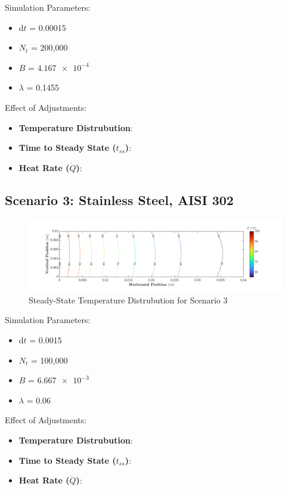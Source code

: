 \documentclass{article}
\begin{document}
Simulation Parameters:
\begin{itemize}
    \item d$t$ = 0.00015
    \item $N_t$ = 200,000
    \item $B$ = $\SI{4.167e-4}{}$
    \item $\lambda$ = 0.1455
\end{itemize}

Effect of Adjustments:
\begin{itemize}
    \item \textbf{Temperature Distrubution}:
    \item \textbf{Time to Steady State ($t_{ss}$)}:
    \item \textbf{Heat Rate ($\dot{Q}$)}:
\end{itemize}

\pagebreak

\subsection{Scenario 3: Stainless Steel, AISI 302}

\begin{figure}[h]
    \centering
    \includegraphics[width=1\textwidth]{fig/contour3.png}
    \caption{Steady-State Temperature Distrubution for Scenario 3}
    \label{fig: Plot3}
\end{figure}

Simulation Parameters:
\begin{itemize}
    \item d$t$ = 0.0015
    \item $N_t$ = 100,000
    \item $B$ = $\SI{6.667e-3}{}$
    \item $\lambda$ = 0.06
\end{itemize}

Effect of Adjustments:
\begin{itemize}
    \item \textbf{Temperature Distrubution}:
    \item \textbf{Time to Steady State ($t_{ss}$)}:
    \item \textbf{Heat Rate ($\dot{Q}$)}:
\end{itemize}
\end{document}

